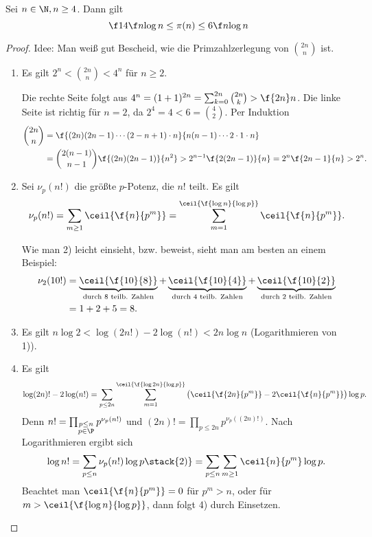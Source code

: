 \begin{st}[Tschebyscheff, 1850] \label{7.5}
	Sei $n \in \N, n \ge 4$.
	Dann gilt
	\[
		\f 14 \f n{\log n}
		\le \pi(n) \le
		6 \f n{\log n}
	\]
	\begin{proof}
		Idee: Man weiß gut Bescheid, wie die Primzahlzerlegung von $\binom{2n}{n}$ ist.
		\begin{enumerate}[1)]
			\item
				Es gilt $2^n < \binom{2n}{n} < 4^n$ für $n \ge 2$.

				Die rechte Seite folgt aus $4^n = (1+1)^{2n} = \sum_{k=0}^{2n} \binom{2n}{k} > \f{2n}n$.
				Die linke Seite ist richtig für $n = 2$, da $2^4 = 4 < 6 = \binom{4}{2}$.
				Per Induktion
				\begin{align*}
					\binom{2n}{n}
					&= \f {(2n)(2n-1)\dotsb (2-n+1)\cdot n}{n(n-1)\dotsb 2\cdot 1 \cdot n} \\
					&= \binom{2(n-1)}{n-1} \f {(2n)(2n-1)}{n^2}
					> 2^{n-1} \f {2(2n-1)}{n}
					= 2^n \f {2n - 1}{n}
					> 2^n.
				\end{align*}
			\item
				Sei $\nu_p(n!)$ die größte $p$-Potenz, die $n!$ teilt.
				Es gilt
				\[
					\nu_p(n!) = \sum_{m \ge 1} \ceil{\f{n}{p^m}} 
					= \sum_{m=1}^{\ceil{\f{\log n}{\log p}}} \ceil{\f {n}{p^m}}.
				\]

				Wie man 2) leicht einsieht, bzw. beweist, sieht man am besten an einem Beispiel:
				\begin{align*}
					\nu_2(10!)
					&= \underbrace{\ceil{\f {10}{8}}}_{\text{durch $8$ teilb. Zahlen}} + \underbrace{\ceil{\f {10}{4}}}_{\text{durch $4$ teilb. Zahlen}} + \underbrace{\ceil{\f {10}{2}}}_{\text{durch $2$ teilb. Zahlen}} \\
					&= 1 + 2 + 5
					= 8.
				\end{align*}
			\item
				Es gilt $n \log 2 < \log(2n!) - 2 \log(n!) < 2n \log n$ (Logarithmieren von 1)).
			\item
				Es gilt
				\[
					\log(2n)! - 2 \log(n!) = \sum_{p \le 2n} \sum_{m = 1}^{\ceil{\f{\log 2n}{\log p}}} \big( \ceil{\f {2n}{p^m}} -  2 \ceil{\f{n}{p^m}} \big) \log p.
				\]
				Denn $n! = \prod_{\substack{p \le n \\ p \in \P}} p^{\nu_p(n!)}$ und $(2n)! = \prod_{p \le 2n} p^{\nu_p((2n)!)}$.
				Nach Logarithmieren ergibt sich
				\[
					\log n! = \sum_{p \le n} \nu_p(n!) \log p
					\stack{2)}= \sum_{p \le n} \sum_{m \ge 1} \ceil{n}{p^m} \log p.
				\]
				Beachtet man $\ceil{\f{n}{p^m}} = 0$ für $p^m > n$, oder für $m > \ceil{\f {\log n}{\log p}}$, dann folgt 4) durch Einsetzen.


\end{enumerate}
\end{proof}
\end{st}
